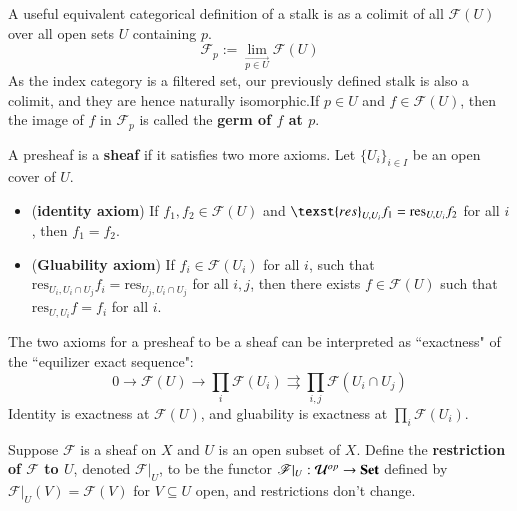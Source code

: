 A useful equivalent categorical definition of a stalk is as a colimit of all $\mathscr{F}(U)$ over all open sets $U$ containing $p$. \begin{equation*}
    \mathscr{F}_p := \lim\limits_{\overrightarrow{p \in U}}\mathscr{F}(U)
\end{equation*}
As the index category is a filtered set, our previously defined stalk is also a colimit, and they are hence naturally isomorphic.If $p \in U$ and $f \in \mathscr{F}(U)$, then the image of $f$ in $\mathscr{F}_p$ is called the \textbf{germ of $f$ at $p$}. 

\begin{definition}
    A presheaf is a \textbf{sheaf} if it satisfies two more axioms. Let $\{U_i\}_{i \in I}$ be an open cover of $U$. \begin{itemize}
        \item (\textbf{identity axiom}) If $f_1,f_2 \in \mathscr{F}(U)$ and $\texst{res}_{U,U_i}f_1 = \text{res}_{U,U_i}f_2$ for all $i$, then $f_1 = f_2$.
        \item (\textbf{Gluability axiom}) If $f_i \in \mathscr{F}(U_i)$ for all $i$, such that $\text{res}_{U_i,U_i\cap U_j}f_i = \text{res}_{U_j,U_i\cap U_j}$ for all $i,j$, then there exists $f \in \mathscr{F}(U)$ such that $\text{res}_{U,U_i}f = f_i$ for all $i$.
    \end{itemize}
\end{definition}

The two axioms for a presheaf to be a sheaf can be interpreted as ``exactness" of the ``equilizer exact sequence": $$0\rightarrow \mathscr{F}(U)\rightarrow \prod_i\mathscr{F}(U_i)\rightrightarrows\prod_{i,j}\mathscr{F}(U_i\cap U_j)$$
Identity is exactness at $\mathscr{F}(U)$, and gluability is exactness at $\prod_i\mathscr{F}(U_i)$.

\begin{example}
    Suppose $\mathscr{F}$ is a sheaf on $X$ and $U$ is an open subset of $X$. Define the \textbf{restriction of $\mathscr{F}$ to $U$}, denoted $\mathscr{F}\vert_U$, to be the functor $\mathscr{F}\vert_U:\mathcal{U}^{op}\rightarrow \normalfont\textbf{Set}$ defined by $\mathscr{F}\vert_U(V) = \mathscr{F}(V)$ for $V \subseteq U$ open, and restrictions don't change.
\end{example}

